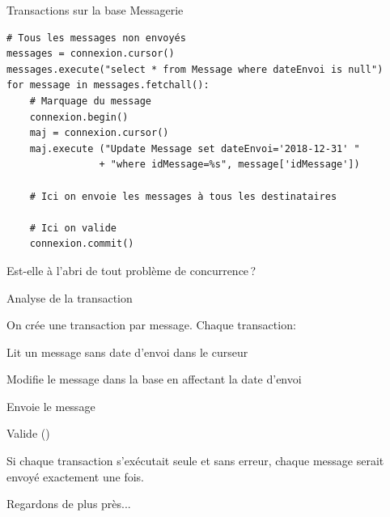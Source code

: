 

\begin{frame}[fragile]{Transactions sur la base Messagerie}

\begin{verbatim}
# Tous les messages non envoyés
messages = connexion.cursor()
messages.execute("select * from Message where dateEnvoi is null")
for message in messages.fetchall():
    # Marquage du message
    connexion.begin()
    maj = connexion.cursor()
    maj.execute ("Update Message set dateEnvoi='2018-12-31' "
                + "where idMessage=%s", message['idMessage'])
                
    # Ici on envoie les messages à tous les destinataires
               
    # Ici on valide
    connexion.commit()
\end{verbatim}

\vfill

\alert{Est-elle à l'abri de tout problème de concurrence\,?}
\end{frame}


\begin{frame}{Analyse de la transaction}

On crée une transaction par message. Chaque transaction:

\vfill

\begin{redbullet}
  \item Lit un message sans date d'envoi dans le curseur
   \item Modifie le message dans la base en affectant la date d'envoi
  \item Envoie le message
   \item Valide ()
\end{redbullet}

\vfill

\begin{blocgauche}
\alert{Si chaque transaction s'exécutait seule et sans erreur,
chaque message serait envoyé exactement une fois.}
\end{blocgauche}
\vfill

Regardons de plus près...

\end{frame}

